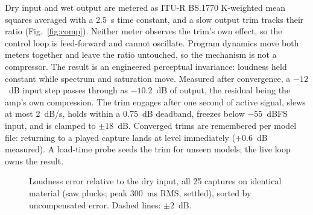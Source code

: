 \documentclass[runningheads,a4paper]{llncs}
\begin{document}
Dry input and wet output are metered as ITU-R BS.1770 K-weighted mean
squares averaged with a 2.5~s time constant, and a slow output trim tracks
their ratio (Fig.~\ref{fig:comp}). Neither meter observes the trim's
own effect, so the control loop is feed-forward and cannot oscillate. Program dynamics move both meters together and leave the
ratio untouched, so the mechanism is not a compressor. The result is an engineered perceptual invariance: loudness held
constant while spectrum and saturation move. Measured after convergence, a $-12$~dB input step passes through as $-10.2$~dB of output,
the residual being the amp's own compression. The trim engages after one
second of active signal, slews at most 2~dB/s, holds within a 0.75~dB
deadband, freezes below $-55$~dBFS input, and is clamped to $\pm 18$~dB.
Converged trims are remembered per model file: returning to a played
capture lands at level immediately ($+0.6$~dB measured). A load-time
probe seeds the trim for unseen models; the live loop owns the result.

\begin{figure}
\centering
{}
\caption{Loudness error relative to the dry input, all 25 captures on
identical material (saw plucks; peak 300~ms RMS, settled), sorted by
uncompensated error. Dashed lines: $\pm 2$~dB.}
\label{fig:bench}
\end{figure}
\end{document}
